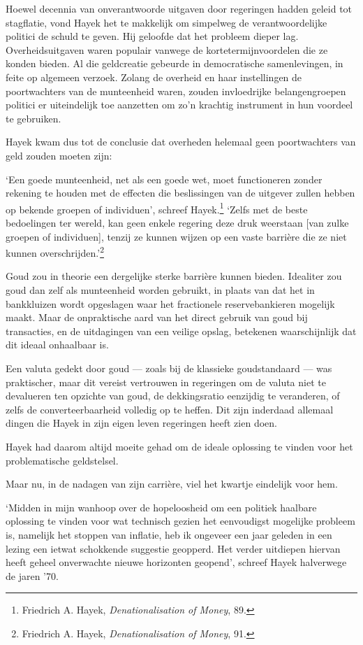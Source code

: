 \documentclass[
  a5paper,
  smalldemyvopaper,11pt,twoside,onecolumn,openright,extrafontsizes,
hidelinks]{memoir}
\begin{document}
Hoewel decennia van onverantwoorde uitgaven door regeringen hadden
geleid tot stagflatie, vond Hayek het te makkelijk om simpelweg de
verantwoordelijke politici de schuld te geven. Hij geloofde dat het
probleem dieper lag. Overheidsuitgaven waren populair vanwege de
kortetermijnvoordelen die ze konden bieden. Al die geldcreatie gebeurde
in democratische samenlevingen, in feite op algemeen verzoek. Zolang de
overheid en haar instellingen de poortwachters van de munteenheid waren,
zouden invloedrijke belangengroepen politici er uiteindelijk toe
aanzetten om zo'n krachtig instrument in hun voordeel te gebruiken.

Hayek kwam dus tot de conclusie dat overheden helemaal geen
poortwachters van geld zouden moeten zijn:

`Een goede munteenheid, net als een goede wet, moet functioneren zonder
rekening te houden met de effecten die beslissingen van de uitgever
zullen hebben op bekende groepen of individuen', schreef
Hayek.\footnote{Friedrich A. Hayek, \emph{Denationalisation of Money},
  89.} `Zelfs met de beste bedoelingen ter wereld, kan geen enkele
regering deze druk weerstaan {[}van zulke groepen of individuen{]},
tenzij ze kunnen wijzen op een vaste barrière die ze niet kunnen
overschrijden.'\footnote{Friedrich A. \hspace{0pt}Hayek,
  \emph{Denationalisation of Money}, 91.}

Goud zou in theorie een dergelijke sterke barrière kunnen bieden.
Idealiter zou goud dan zelf als munteenheid worden gebruikt, in plaats
van dat het in bankkluizen wordt opgeslagen waar het fractionele
reservebankieren mogelijk maakt. Maar de onpraktische aard van het
direct gebruik van goud bij transacties, en de uitdagingen van een
veilige opslag, betekenen waarschijnlijk dat dit ideaal onhaalbaar is.

Een valuta gedekt door goud --- zoals bij de klassieke goudstandaard ---
was praktischer, maar dit vereist vertrouwen in regeringen om de valuta
niet te devalueren ten opzichte van goud, de dekkingsratio eenzijdig te
veranderen, of zelfs de converteerbaarheid volledig op te heffen. Dit
zijn inderdaad allemaal dingen die Hayek in zijn eigen leven regeringen
heeft zien doen.

Hayek had daarom altijd moeite gehad om de ideale oplossing te vinden
voor het problematische geldstelsel.

Maar nu, in de nadagen van zijn carrière, viel het kwartje eindelijk
voor hem.

`Midden in mijn wanhoop over de hopeloosheid om een politiek haalbare
oplossing te vinden voor wat technisch gezien het eenvoudigst mogelijke
probleem is, namelijk het stoppen van inflatie, heb ik ongeveer een jaar
geleden in een lezing een ietwat schokkende suggestie geopperd. Het
verder uitdiepen hiervan heeft geheel onverwachte nieuwe horizonten
geopend', schreef Hayek halverwege de jaren '70.
\end{document}
